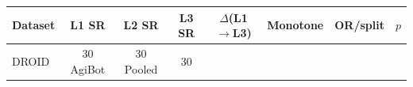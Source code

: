 \begin{tabular}{lccccccc}
\hline
Dataset & L1 SR & L2 SR & L3 SR & $\Delta$(L1$\to$L3) & Monotone & OR/split & $p$ \\
\hline
DROID & 30%
AgiBot & 30%
Pooled & 30%
\hline
\end{tabular}

